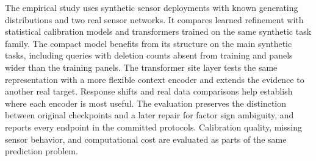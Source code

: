 The empirical study uses synthetic sensor deployments with known generating distributions and two real sensor networks. It compares learned refinement with statistical calibration models and transformers trained on the same synthetic task family. The compact model benefits from its structure on the main synthetic tasks, including queries with deletion counts absent from training and panels wider than the training panels. The transformer site layer tests the same representation with a more flexible context encoder and extends the evidence to another real target. Response shifts and real data comparisons help establish where each encoder is most useful. The evaluation preserves the distinction between original checkpoints and a later repair for factor sign ambiguity, and reports every endpoint in the committed protocols. Calibration quality, missing sensor behavior, and computational cost are evaluated as parts of the same prediction problem.
